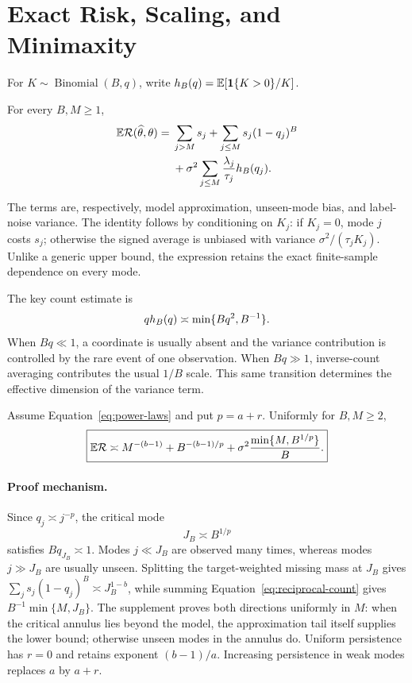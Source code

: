 \section{Exact Risk, Scaling, and Minimaxity}

For $K\sim\operatorname{Binomial}(B,q)$, write
$h_B(q)=\mathbb{E}[\mathbf{1}\{K>0\}/K]$.

\begin{theorem}
\label{thm:exact}
For every $B,M\ge1$,
\begin{align}
\mathbb{E}\mathcal{R}(\widehat\theta,\theta)
={}&\sum_{j>M}s_j
+\sum_{j\le M}s_j(1-q_j)^B \nonumber\\
&+\sigma^2\sum_{j\le M}\frac{\lambda_j}{\tau_j}h_B(q_j).
\label{eq:exact-risk}
\end{align}
\end{theorem}
The terms are, respectively, model approximation, unseen-mode bias, and
label-noise variance.  The identity follows by conditioning on $K_j$: if
$K_j=0$, mode $j$ costs $s_j$; otherwise the signed average is unbiased with
variance $\sigma^2/(\tau_jK_j)$.  Unlike a generic upper bound, the expression
retains the exact finite-sample dependence on every mode.

The key count estimate is
\begin{equation}
qh_B(q)\mathrel{\asymp} \min\{Bq^2,B^{-1}\}.
\label{eq:reciprocal-count}
\end{equation}
When $Bq\ll1$, a coordinate is usually absent and the variance contribution is
controlled by the rare event of one observation.  When $Bq\gg1$, inverse-count
averaging contributes the usual $1/B$ scale.  This same transition determines
the effective dimension of the variance term.

\begin{theorem}
\label{thm:scaling}
Assume Equation~\eqref{eq:power-laws} and put $p=a+r$.  Uniformly for
$B,M\ge2$,
\begin{equation}
\boxed{
\mathbb{E}\mathcal{R}\mathrel{\asymp}
M^{-(b-1)}+B^{-(b-1)/p}
+\sigma^2\frac{\min\{M,B^{1/p}\}}{B}.}
\label{eq:block-scaling}
\end{equation}
\end{theorem}

\paragraph{Proof mechanism.}
Since $q_j\asymp j^{-p}$, the critical mode
\begin{equation}
J_B\asymp B^{1/p}
\label{eq:critical-mode}
\end{equation}
satisfies $Bq_{J_B}\asymp1$.  Modes $j\ll J_B$ are observed many times,
whereas modes $j\gg J_B$ are usually unseen.  Splitting the target-weighted
missing mass at $J_B$ gives
$\sum_j s_j(1-q_j)^B\asymp J_B^{1-b}$, while summing
Equation~\eqref{eq:reciprocal-count} gives
$B^{-1}\min\{M,J_B\}$.  The supplement proves both directions uniformly in
$M$: when the critical annulus lies beyond the model, the approximation tail
itself supplies the lower bound; otherwise unseen modes in the annulus do.
Uniform persistence has $r=0$ and retains exponent $(b-1)/a$.  Increasing
persistence in weak modes replaces $a$ by $a+r$.

